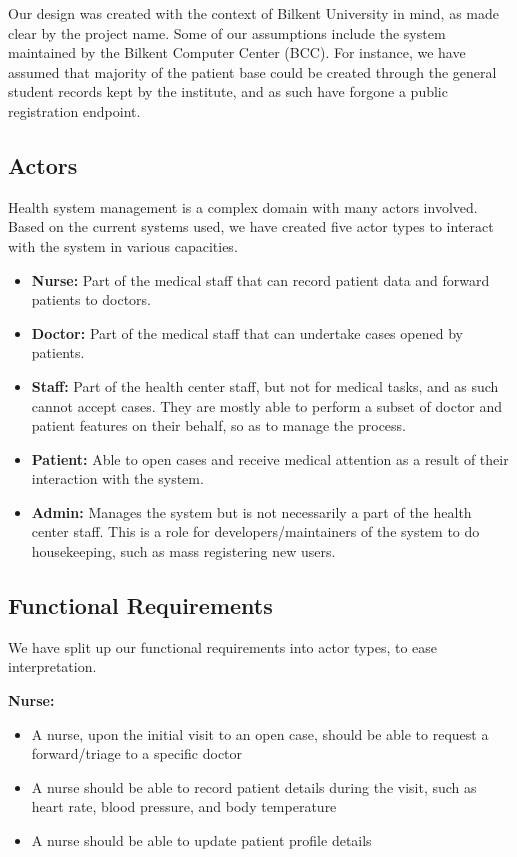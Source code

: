 \documentclass[a4paper, 12pt, titlepage]{article}
\begin{document}
  Our design was created with the context of Bilkent University in mind, as made clear by the project name.
  Some of our assumptions include the system maintained by the Bilkent Computer Center (BCC).
  For instance, we have assumed that majority of the patient base could be created through the general student records
  kept by the institute, and as such have forgone a public registration endpoint.

  \subsection{Actors}

  Health system management is a complex domain with many actors involved.
  Based on the current systems used, we have created five actor types to interact with the system in various capacities.

  \begin{itemize}
    \item \textbf{Nurse:} Part of the medical staff that can record patient data and forward patients to doctors.
    \item \textbf{Doctor:} Part of the medical staff that can undertake cases opened by patients.
    \item \textbf{Staff:} Part of the health center staff, but not for medical tasks, and as such cannot accept cases.
      They are mostly able to perform a subset of doctor and patient features on their behalf, so as to manage the process.
    \item \textbf{Patient:} Able to open cases and receive medical attention as a result of their interaction with the system.
    \item \textbf{Admin:} Manages the system but is not necessarily a part of the health center staff.
      This is a role for developers/maintainers of the system to do housekeeping, such as mass registering new users.
  \end{itemize}

  \subsection{Functional Requirements}

  We have split up our functional requirements into actor types, to ease interpretation.

  \textbf{Nurse:}
  \begin{itemize}
    \item A nurse, upon the initial visit to an open case, should be able to request a forward/triage to a specific doctor
    \item A nurse should be able to record patient details during the visit, such as heart rate, blood pressure, and body temperature
    \item A nurse should be able to update patient profile details
  \end{itemize}
\end{document}
